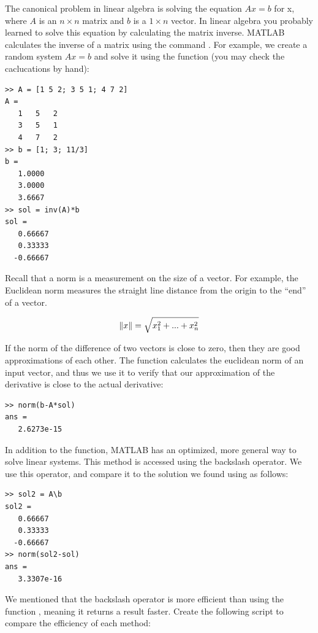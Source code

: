 The canonical problem in linear algebra is solving the equation $Ax = b$ for x, where $A$ is an $n \times n$ matrix and $b$ is a  $1 \times n$ vector. In linear algebra you probably learned to solve this equation by calculating the matrix inverse. MATLAB calculates the inverse of a matrix using the command . For example, we create a random system $Ax =b$ and solve it using the  function (you may check the caclucations by hand):

\begin{lstlisting}[style=matlab]
>> A = [1 5 2; 3 5 1; 4 7 2]
A =
   1   5   2
   3   5   1
   4   7   2
>> b = [1; 3; 11/3]
b =
   1.0000
   3.0000
   3.6667
>> sol = inv(A)*b
sol =
   0.66667
   0.33333
  -0.66667
\end{lstlisting}

Recall that a norm is a measurement on the size of a vector.  For example, the Euclidean norm measures the straight line distance from the origin to the ``end'' of a vector.

\[
\lVert x\rVert = \sqrt{x_1^2 + ... + x_n^2}
\]

If the norm of the difference of two vectors is close to zero, then they are good approximations of each other.  The  function calculates the euclidean norm of an input vector, and thus we use it to verify that our approximation of the derivative is close to the actual derivative:

\begin{lstlisting}[style=matlab]
>> norm(b-A*sol)
ans =  
   2.6273e-15
\end{lstlisting}

In addition to the  function, MATLAB has an optimized, more general way to solve linear systems. This method is accessed using the backslash operator. We use this operator, and compare it to the solution we found using  as follows:

\begin{lstlisting}[style=matlab]
>> sol2 = A\b
sol2 =
   0.66667
   0.33333
  -0.66667
>> norm(sol2-sol)
ans =
   3.3307e-16
\end{lstlisting}

We mentioned that the backslash operator is more efficient than using the function , meaning it returns a result faster. Create the following script to compare the efficiency of each method:

